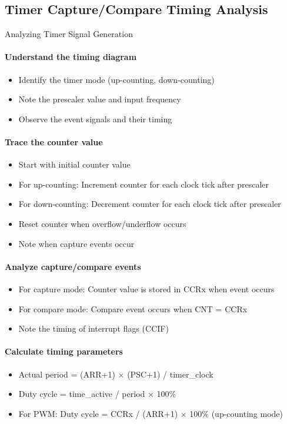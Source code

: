 \subsection{Timer Capture/Compare Timing Analysis}

\begin{KR}{Analyzing Timer Signal Generation}\\
\paragraph{Understand the timing diagram}
\begin{itemize}
    \item Identify the timer mode (up-counting, down-counting)
    \item Note the prescaler value and input frequency
    \item Observe the event signals and their timing
\end{itemize}

\paragraph{Trace the counter value}
\begin{itemize}
    \item Start with initial counter value
    \item For up-counting: Increment counter for each clock tick after prescaler
    \item For down-counting: Decrement counter for each clock tick after prescaler
    \item Reset counter when overflow/underflow occurs
    \item Note when capture events occur
\end{itemize}

\paragraph{Analyze capture/compare events}
\begin{itemize}
    \item For capture mode: Counter value is stored in CCRx when event occurs
    \item For compare mode: Compare event occurs when CNT = CCRx
    \item Note the timing of interrupt flags (CCIF)
\end{itemize}

\paragraph{Calculate timing parameters}
\begin{itemize}
    \item Actual period = (ARR+1) × (PSC+1) / timer\_clock
    \item Duty cycle = time\_active / period × 100\%
    \item For PWM: Duty cycle = CCRx / (ARR+1) × 100\% (up-counting mode)
\end{itemize}
\end{KR}

